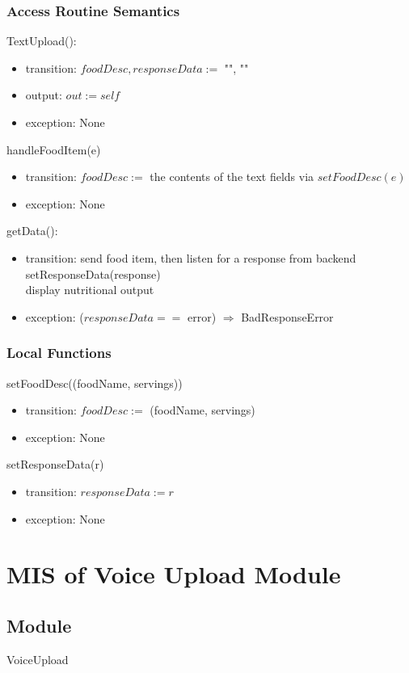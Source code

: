 \documentclass[12pt, titlepage]{article}
\begin{document}
\subsubsection{Access Routine Semantics}
\noindent TextUpload():
\begin{itemize}
	\item transition: $foodDesc, responseData := $ "", ""
	\item output: $out := self$ 
	\item exception: None
\end{itemize}
\noindent handleFoodItem(e)
\begin{itemize}
	\item transition: $foodDesc :=$ the contents of the text fields via 
	$setFoodDesc(e)$
	\item exception: None
\end{itemize}
\noindent getData():
\begin{itemize}
	\item transition: send food item, then listen for a response from 
	backend\\ setResponseData(response) \\ display nutritional output
	\item exception: ($responseData ==$ error) $\Rightarrow$ BadResponseError
\end{itemize}
\subsubsection{Local Functions}
\noindent setFoodDesc((foodName, servings))
\begin{itemize}
	\item transition: $ foodDesc := $ (foodName, servings)
	\item exception: None
\end{itemize}
\noindent setResponseData(r)
\begin{itemize}
	\item transition: $ responseData:=r $
	\item exception: None
\end{itemize}

\newpage

\section{MIS of Voice Upload Module} \label{VoiceUpload} 
\subsection{Module}
VoiceUpload
\end{document}
